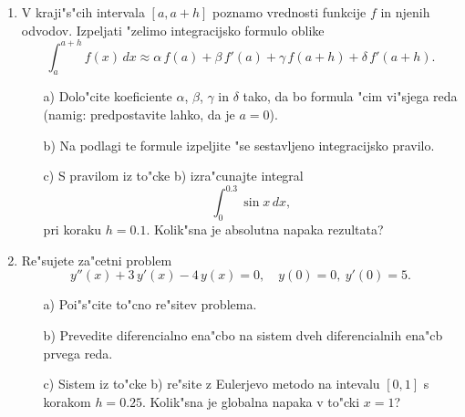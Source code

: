 \documentclass[12pt,a4paper]{article}
\begin{document}
\begin{enumerate}
  \item V kraji"s"cih intervala $[a,a+h]$ poznamo vrednosti 
    funkcije $f$ in njenih odvodov. Izpeljati "zelimo 
    integracijsko formulo oblike
    $$\int_{a}^{a+h} f(x)\,dx\approx \alpha\,f(a)+
    \beta\,f'(a)+\gamma\,f(a+h)+\delta\,f'(a+h).$$
  \begin{itemize}
    \item[a)] Dolo"cite koeficiente $\alpha$, $\beta$, $\gamma$
      in $\delta$ tako, da bo formula "cim vi"sjega reda (namig:
      predpostavite lahko, da je $a=0$).
    \item[b)] Na podlagi te formule izpeljite "se 
      sestavljeno integracijsko pravilo.
    \item[c)] S pravilom iz to"cke b) izra"cunajte integral
      $$\int_{0}^{0.3} \sin{x}\,dx,$$
      pri koraku $h=0.1$. Kolik"sna je absolutna napaka rezultata?
  \end{itemize}

  \item Re"sujete za"cetni problem
    $$y''(x)+3\,y'(x)-4\,y(x)=0,\quad y(0)=0,\ y'(0)=5.$$
  \begin{itemize}
     \item[a)] Poi"s"cite to"cno re"sitev problema.
     \item[b)] Prevedite diferencialno ena"cbo na sistem dveh
       diferencialnih ena"cb prvega reda.
     \item[c)] Sistem iz to"cke b) re"site z Eulerjevo metodo
       na intevalu $[0,1]$ s korakom $h=0.25$. Kolik"sna je
       globalna napaka v to"cki $x=1$?
     \end{itemize}
  

\end{enumerate}
\end{document}

